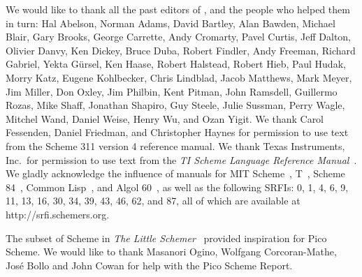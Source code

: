 We would like to thank all the past editors of \rsevenrs\cite{R7RS}, and the
people who helped them in turn: Hal Abelson, Norman Adams, David
Bartley, Alan Bawden, Michael Blair, Gary Brooks, George Carrette,
Andy Cromarty, Pavel Curtis, Jeff Dalton, Olivier Danvy, Ken Dickey,
Bruce Duba, Robert Findler, Andy Freeman, Richard Gabriel, Yekta
G\"ursel, Ken Haase, Robert Halstead, Robert Hieb, Paul Hudak, Morry
Katz, Eugene Kohlbecker, Chris Lindblad, Jacob Matthews, Mark Meyer,
Jim Miller, Don Oxley, Jim Philbin, Kent Pitman, John Ramsdell,
Guillermo Rozas, Mike Shaff, Jonathan Shapiro, Guy Steele, Julie
Sussman, Perry Wagle, Mitchel Wand, Daniel Weise, Henry Wu, and Ozan
Yigit.  We thank Carol Fessenden, Daniel Friedman, and Christopher
Haynes for permission to use text from the Scheme 311 version 4
reference manual.  We thank Texas Instruments, Inc.~for permission to
use text from the {\em TI Scheme Language Reference
Manual}~\cite{TImanual85}.  We gladly acknowledge the influence of
manuals for MIT Scheme~\cite{MITScheme}, T~\cite{Rees84}, Scheme
84~\cite{Scheme84}, Common Lisp~\cite{CLtL}, and Algol 60~\cite{Naur63},
as well as the following SRFIs:  0, 1, 4, 6, 9, 11, 13, 16, 30, 34, 39, 43, 46, 62, and 87,
all of which are available at {\cf http://srfi.schemers.org}.



The subset of Scheme in
{\em The Little Schemer}~\cite{LittleSchemer} provided inspiration for
Pico Scheme. We would like to thank Masanori Ogino, Wolfgang Corcoran-Mathe, José Bollo and John Cowan
for help with the Pico Scheme Report.


